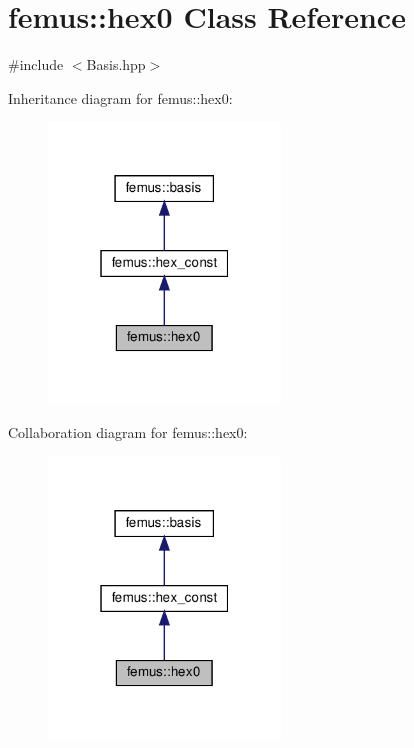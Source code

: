 \hypertarget{classfemus_1_1hex0}{}\section{femus\+:\+:hex0 Class Reference}
\label{classfemus_1_1hex0}


{\ttfamily \#include $<$Basis.\+hpp$>$}



Inheritance diagram for femus\+:\+:hex0\+:
\nopagebreak
\begin{figure}[H]
\begin{center}
\leavevmode
\includegraphics[width=175pt]{classfemus_1_1hex0__inherit__graph}
\end{center}
\end{figure}


Collaboration diagram for femus\+:\+:hex0\+:
\nopagebreak
\begin{figure}[H]
\begin{center}
\leavevmode
\includegraphics[width=175pt]{classfemus_1_1hex0__coll__graph}
\end{center}
\end{figure}
